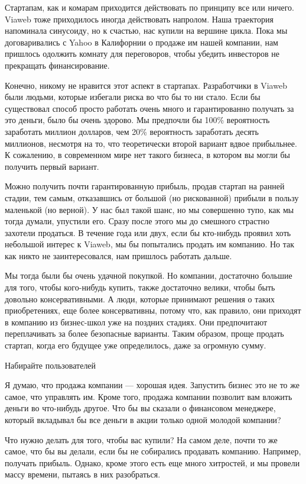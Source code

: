 \documentclass[ebook,12pt,oneside,openany]{memoir}
\begin{document}
Стартапам, как и комарам приходится действовать по принципу все или
ничего. Viaweb тоже приходилось иногда действовать напролом. Наша
траектория напоминала синусоиду, но к счастью, нас купили на вершине
цикла. Пока мы договаривались с Yahoo в Калифорнии о продаже им нашей
компании, нам пришлось одолжить комнату для переговоров, чтобы убедить
инвесторов не прекращать финансирование.

Конечно, никому не нравится этот аспект в стартапах. Разработчики в
Viaweb были людьми, которые избегали риска во что бы то ни стало. Если
бы существовал способ просто работать очень много и гарантированно
получать за это деньги, было бы очень здорово. Мы предпочли бы 100\%
вероятность заработать миллион долларов, чем 20\% вероятность
заработать десять миллионов, несмотря на то, что теоретически второй
вариант вдвое прибыльнее. К сожалению, в современном мире нет такого
бизнеса, в котором вы могли бы получить первый вариант.

Можно получить почти гарантированную прибыль, продав стартап на ранней
стадии, тем самым, отказавшись от большой (но рискованной) прибыли в
пользу маленькой (но верной). У нас был такой шанс, но мы совершенно
тупо, как мы тогда думали, упустили его. Сразу после этого мы до
смешного страстно захотели продаться. В течение года или двух, если бы
кто-нибудь проявил хоть небольшой интерес к Viaweb, мы бы попытались
продать им компанию. Но так как никто не заинтересовался, нам пришлось
работать дальше.

Мы тогда были бы очень удачной покупкой. Но компании, достаточно
большие для того, чтобы кого-нибудь купить, также достаточно велики,
чтобы быть довольно консервативными. А люди, которые принимают решения
о таких приобретениях, еще более консервативны, потому что, как
правило, они приходят в компанию из бизнес-школ уже на поздних
стадиях. Они предпочитают переплачивать за более безопасные варианты.
Таким образом, проще продать стартап, когда его будущее уже
определилось, даже за огромную сумму.

Набирайте пользователей

Я думаю, что продажа компании — хорошая идея. Запустить бизнес это не
то же самое, что управлять им. Кроме того, продажа компании позволит
вам вложить деньги во что-нибудь другое. Что бы вы сказали о
финансовом менеджере, который вкладывал бы все деньги в акции только
одной молодой компании?

Что нужно делать для того, чтобы вас купили? На самом деле, почти то
же самое, что бы вы делали, если бы не собирались продавать компанию.
Например, получать прибыль. Однако, кроме этого есть еще много
хитростей, и мы провели массу времени, пытаясь в них разобраться.
\end{document}
